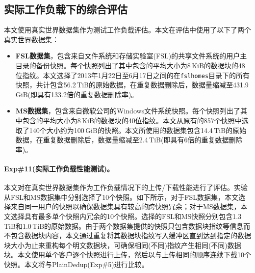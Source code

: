 \subsection{实际工作负载下的综合评估}
\label{subsec:sgxdedup-real-world}

本文使用真实世界数据集作为测试工作负载评估\sysnameS。本文在评估中使用了以下了两个真实世界数据集：

\begin{itemize}
    \item \textbf{FSL数据集}，包含来自文件系统和存储实验室(FSL)\cite{fsl,sun16}的共享文件系统的用户主目录的备份快照。每个快照列出了其中包含的平均大小为8\,KiB的数据块的48位指纹。本文选择了2013年1月22日至6月17日之间的在\texttt{fslhomes}目录下的所有快照，共计包含56.2\,TiB的原始数据，在重复数据删除后，数据量缩减至431.9\,GiB(即具有133.2倍的重复数据删除率)。
    \item \textbf{MS数据集}，包含来自微软公司\cite{meyer2011deduplication}的Windows文件系统快照。每个快照列出了其中包含的平均大小为8\,KiB的数据块的40位指纹。本文从原有的857个快照中选取了140个大小约为100\,GiB的快照。本文所使用的数据集包含14.4\,TiB的原始数据，在重复数据删除后，数据量缩减至2.4\,TiB(即具有6倍的重复数据删除率)。
\end{itemize}

\paragraph*{Exp\#11(实际工作负载性能测试)。} 本文对\sysnameS 在真实世界数据集作为工作负载情况下的上传/下载性能进行了评估。实验从FSL和MS数据集中分别选择了10个快照。如下所示，对于FSL数据集，本文选择来自同一用户的快照以确保数据集具有较高的跨快照冗余；对于MS数据集，本文选择具有最多单个快照内冗余的10个快照。选择的FSL和MS快照分别包含1.3\,TiB和1.0\,TiB的原始数据。由于两个数据集提供的快照只包含数据块指纹等信息而不包含数据块内容，本文通过重复将其数据块指纹写入缓冲区直到达到指定的数据块大小为止来重构每个明文数据块，可确保相同(不同)指纹产生相同(不同)数据块。本文使用单个客户逐个快照进行上传，然后以与上传相同的顺序连续下载10个快照。本文将\sysnameS 与PlainDedup(Exp\#5)进行比较。

